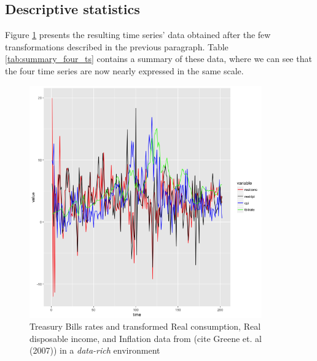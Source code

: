 
\subsection{Descriptive statistics}

Figure \ref{all_series_plot} presents the resulting time series' data obtained after the few transformations described in the previous paragraph. Table \ref{tab:summary_four_ts} contains a summary of these data, where we can see that the four time series are now nearly expressed in the same scale.

\begin{figure}[!htb]
\centering
\includegraphics[width=10cm]{gfx/chapter-rvfl-ensembles/all_series.png}
\caption{Treasury Bills rates and transformed Real consumption, Real disposable income, and  Inflation data from (cite Greene et. al (2007)) in a \textit{data-rich} environment}
\label{all_series_plot}
\end{figure}


